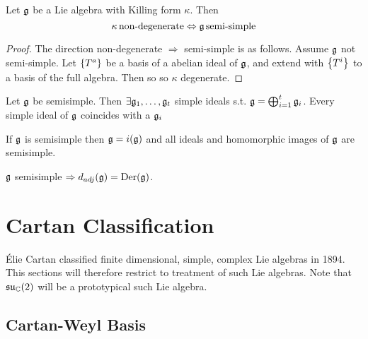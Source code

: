 \documentclass{article}
\begin{document}
\begin{theorem}[Cartan]
	Let $\mathfrak{g}$ be a Lie algebra with Killing form $\kappa$. Then 
	\[
	\kappa \, \text{non-degenerate} \Leftrightarrow \mathfrak{g} \, \text{semi-simple}
	\]
\end{theorem}
\begin{proof}
	The direction non-degenerate $\Rightarrow$ semi-simple is as follows. Assume $\mathfrak{g}$ not semi-simple. Let $\left\{ T^a \right\}$ be a basis of a abelian ideal of $\mathfrak{g}$, and extend with $\left\{ T^i \right\}$ to a basis of the full algebra. Then
	so
	so $\kappa$ degenerate. 
\end{proof}

\begin{theorem}
	Let $\mathfrak{g}$ be semisimple. Then $\exists \mathfrak{g}_1, \dots, \mathfrak{g}_t$ simple ideals s.t. $\mathfrak{g} = \bigoplus_{i=1}^t \mathfrak{g}_i$. Every simple ideal of $\mathfrak{g}$ coincides with a $\mathfrak{g}_i$
\end{theorem}
\begin{corollary}
	If $\mathfrak{g}$ is semisimple then $\mathfrak{g} = i(\mathfrak{g})$ and all ideals and homomorphic images of $\mathfrak{g}$ are semisimple. 
\end{corollary}

\begin{theorem}
	$\mathfrak{g}$ semisimple $\Rightarrow d_{adj}(\mathfrak{g}) = \operatorname{Der}(\mathfrak{g})$. 
\end{theorem}
\section{Cartan Classification}
\'Elie Cartan classified finite dimensional, simple, complex Lie algebras in 1894. This sections will therefore restrict to treatment of such Lie algebras. Note that $\mathfrak{su}_{\mathbb{C}}(2)$ will be a prototypical such Lie algebra. 



\subsection{Cartan-Weyl Basis}
\end{document}
